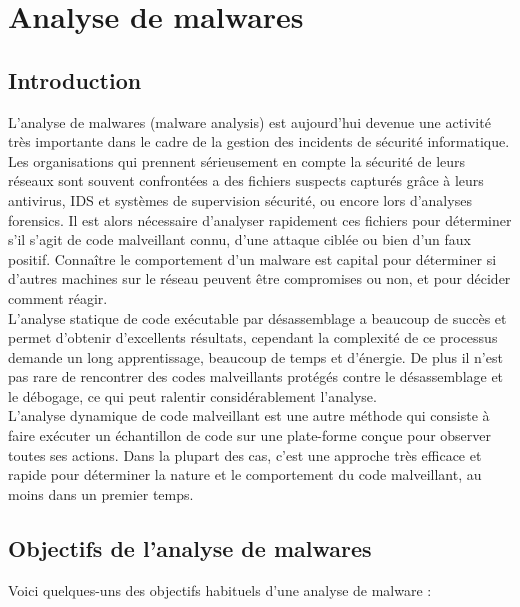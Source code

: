 \chapter{Analyse de malwares}
\section{Introduction}
L'analyse de malwares (malware analysis) est aujourd’hui devenue une activité très importante dans le cadre de la gestion des incidents de sécurité informatique. Les organisations qui prennent sérieusement en compte la sécurité de leurs réseaux sont souvent confrontées a des fichiers suspects capturés grâce à leurs antivirus, IDS et systèmes de supervision sécurité, ou encore lors d'analyses forensics. Il est alors nécessaire d'analyser rapidement ces fichiers pour déterminer s'il s'agit de code malveillant connu, d'une attaque ciblée ou bien d'un faux positif. Connaître le comportement d'un malware est capital pour déterminer si d'autres machines sur le réseau peuvent être compromises ou non, et pour décider comment réagir.\\


L'analyse statique de code exécutable par désassemblage a beaucoup de succès et permet d'obtenir d'excellents résultats, cependant la complexité de ce processus demande un long apprentissage, beaucoup de temps et d'énergie. De plus il n'est pas rare de rencontrer des codes malveillants protégés contre le désassemblage et le débogage, ce qui peut ralentir considérablement l'analyse.\\


L'analyse dynamique de code malveillant est une autre méthode qui consiste à faire exécuter un échantillon de code sur une plate-forme conçue pour observer toutes ses actions. Dans la plupart des cas, c'est une approche très efficace et rapide pour déterminer la nature et le comportement du code malveillant, au moins dans un premier temps.

\section{Objectifs de l'analyse de malwares}
Voici quelques-uns des objectifs habituels d'une analyse de malware :\\


